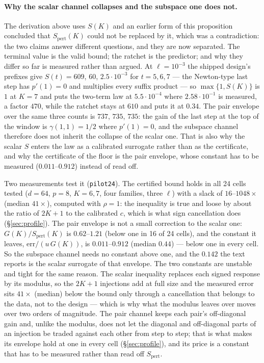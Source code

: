 \paragraph{Why the scalar channel collapses and the subspace one does not.}  The derivation
above uses $S(K)$ and an earlier form of this proposition concluded that
$S_{\mathrm{pert}}(K)$ could not be replaced by it, which was a contradiction: the two
claims answer different questions, and they are now separated.  The terminal value is the
valid bound; the ratchet is the predictor; and why they differ so far is measured rather
than argued.  At $\ell=10^{-3}$ the shipped design's prefixes give $S(t)=609$, $60$,
$2.5\cdot10^{-3}$ for $t=5,6,7$ --- the Newton-type last step has $p'(1)=0$ and multiplies
every suffix product --- so $\max\{1,S(K)\}$ is $1$ at $K=7$ and puts the two-term law at
$5.5\cdot10^{-4}$ where $2.58\cdot10^{-1}$ is measured, a factor $470$, while the ratchet
stays at $610$ and puts it at $0.34$.  The pair envelope over the same three counts is
$737$, $735$, $735$: the gain of the last step at the top of the window is
$\gamma(1,1)=1/2$ where $p'(1)=0$, and the subspace channel therefore does not inherit the
collapse of the scalar one.  That is also why the scalar $S$ enters the law as a calibrated
surrogate rather than as the certificate, and why the certificate of the floor is the pair
envelope, whose constant has to be measured ($0.011$--$0.912$) instead of read off.

Two measurements test it (\texttt{pilot24}).  The certified bound holds in all 24 cells
tested ($d=64$, $p=8$, $K=6,7$, four families, three $\ell$) with a slack of
$16$--$1048\times$ (median $41\times$), computed with $\rho=1$: the inequality is true and
loose by about the ratio of $2K+1$ to the calibrated $c$, which is what sign cancellation
does (\S\ref{sec:profile}).  The pair envelope is not a small correction to the scalar one:
$G(K)/S_{\mathrm{pert}}(K)$ is $0.62$--$1.21$ (below one in 16 of 24 cells), and
the constant it leaves, $\mathrm{err}/(u\,G(K))$, is $0.011$--$0.912$
(median $0.44$) --- below one in every cell.  So the subspace channel needs no constant
above one, and the $0.142$ the text reports is the scalar surrogate of that envelope.  The
two constants are unstable and tight for the same reason.  The scalar inequality replaces
each signed response by its modulus, so the $2K+1$ injections add at full size and the
measured error sits $41\times$ (median) below the bound only through a cancellation that
belongs to the data, not to the design --- which is why what the modulus leaves over moves
over two orders of magnitude.  The pair channel keeps each pair's off-diagonal gain and,
unlike the modulus, does not let the diagonal and off-diagonal parts of an injection be
traded against each other from step to step; that is what makes its envelope hold at one in
every cell (\S\ref{sec:profile}), and its price is a constant that has to be measured
rather than read off $S_{\mathrm{pert}}$.

